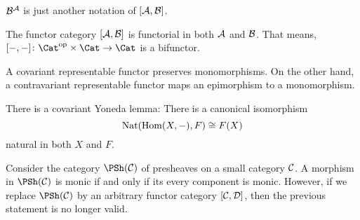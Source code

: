 \begin{rec}
  ${\cal B}^{{\cal A}}$ is just another notation of $[{\cal A},{\cal B}]$.
\end{rec}
\begin{ex}
  The functor category $[{\cal A},{\cal B}]$ is functorial in both ${\cal A}$ and ${\cal B}$. That means, $[-,-]\colon\Cat^{\op}\times\Cat\to\Cat$ is a bifunctor.
\end{ex}
\begin{ex}
  A covariant representable functor preserves monomorphisms. On the other hand, a contravariant representable functor maps an epimorphism to a monomorphism.
\end{ex}
\begin{ex}
  There is a covariant Yoneda lemma: There is a canonical isomorphism
    \begin{equation*}
      \operatorname{Nat}(\operatorname{Hom}(X,-),F)\cong F(X)
    \end{equation*}
    natural in both $X$ and $F$.
\end{ex}
\begin{ex}
  Consider the category $\PSh(\Cc)$ of presheaves on a small category ${\cal C}$. A morphism in $\PSh(\Cc)$ is monic if and only if its every component is monic.
  However, if we replace $\PSh(\Cc)$ by an arbitrary functor category $[{\cal C},{\cal D}]$, then the previous statement is no longer valid.
\end{ex}
